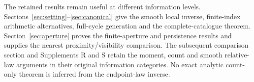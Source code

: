 The retained results remain useful at different information levels.
Sections~\ref{sec:setting}--\ref{sec:canonical} give the smooth local
inverse, finite-index arithmetic alternatives, full-cycle generation and
the complete-catalogue theorem. Section~\ref{sec:aperture} proves the
finite-aperture and persistence results and supplies the nearest
proximity/visibility comparison. The subsequent comparison section and
Supplements R and S retain the moment, count and smooth relative-law
arguments in their original information categories. No exact analytic
count-only theorem is inferred from the endpoint-law inverse.
